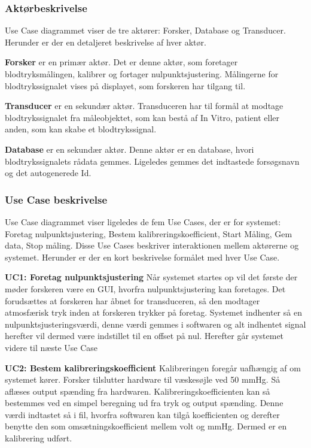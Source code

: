 \subsubsection{Aktørbeskrivelse}
Use Case diagrammet viser de tre aktører: Forsker, Database og Transducer. Herunder er der en detaljeret beskrivelse af hver aktør.

\textbf{Forsker} er en primær aktør. Det er denne aktør, som foretager blodtryksmålingen, kalibrer og fortager nulpunktsjustering. Målingerne for blodtrykssignalet vises på displayet, som forskeren har tilgang til. 

\textbf{Transducer} er en sekundær aktør. Transduceren har til formål at modtage blodtrykssignalet fra måleobjektet, som kan bestå af In Vitro, patient eller anden, som kan skabe et blodtrykssignal. 

\textbf{Database} er en sekundær aktør. Denne aktør er en database, hvori blodtrykssignalets rådata gemmes. Ligeledes gemmes det indtastede forsøgsnavn og det autogenerede Id.

\subsubsection{Use Case beskrivelse}
Use Case diagrammet viser ligeledes de fem Use Cases, der er for systemet: Foretag nulpunktsjustering, Bestem kalibreringskoefficient, Start Måling, Gem data, Stop måling. Disse Use Cases beskriver interaktionen mellem aktørerne og systemet. Herunder er der en kort beskrivelse formålet med hver Use Case.

\textbf{UC1: Foretag nulpunktsjustering}
Når systemet startes op vil det første der møder forskeren være en GUI, hvorfra nulpunktsjustering kan foretages. Det forudsættes at forskeren har åbnet for transduceren, så den modtager atmosfærisk tryk inden at forskeren trykker på foretag. Systemet indhenter så en nulpunktsjusteringsværdi, denne værdi gemmes i softwaren og alt indhentet signal herefter vil dermed være indstillet til en offset på nul. Herefter går systemet videre til næste Use Case

\textbf{UC2: Bestem kalibreringskoefficient}
Kalibreringen foregår uafhængig af om systemet kører. Forsker tilslutter hardware til væskesøjle ved 50 mmHg. Så aflæses output spænding fra hardwaren. Kalibreringskoefficienten kan så bestemmes ved en simpel beregning ud fra tryk og output spænding. Denne værdi indtastet så i fil, hvorfra softwaren kan tilgå koefficienten og derefter benytte den som omsætningskoefficient mellem volt og mmHg. Dermed er en kalibrering udført.   

